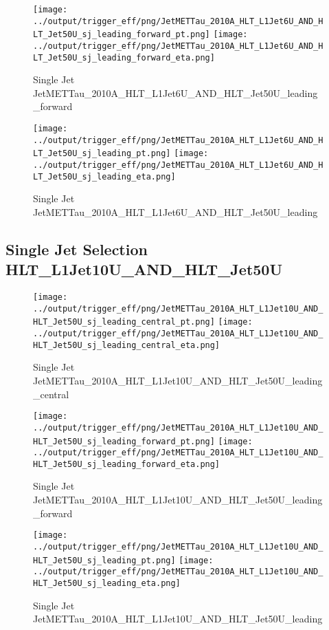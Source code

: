\documentclass[11pt]{article}
\begin{document}
\begin{figure}[ht]
\centering
\texttt{[image: ../output/trigger\_eff/png/JetMETTau\_2010A\_HLT\_L1Jet6U\_AND\_HLT\_Jet50U\_sj\_leading\_forward\_pt.png]}
\texttt{[image: ../output/trigger\_eff/png/JetMETTau\_2010A\_HLT\_L1Jet6U\_AND\_HLT\_Jet50U\_sj\_leading\_forward\_eta.png]}
\caption{Single Jet JetMETTau\_2010A\_HLT\_L1Jet6U\_AND\_HLT\_Jet50U\_leading\_forward}
\label{fig:jetmettau_sj_L1Jet6U_AND_HLT_Jet50U_leading_forward}
\end{figure}

\begin{figure}[ht]
\centering
\texttt{[image: ../output/trigger\_eff/png/JetMETTau\_2010A\_HLT\_L1Jet6U\_AND\_HLT\_Jet50U\_sj\_leading\_pt.png]}
\texttt{[image: ../output/trigger\_eff/png/JetMETTau\_2010A\_HLT\_L1Jet6U\_AND\_HLT\_Jet50U\_sj\_leading\_eta.png]}
\caption{Single Jet JetMETTau\_2010A\_HLT\_L1Jet6U\_AND\_HLT\_Jet50U\_leading}
\label{fig:jetmettau_sj_L1Jet6U_AND_HLT_Jet50U_leading}
\end{figure}


\newpage
\subsection{Single Jet Selection HLT\_L1Jet10U\_AND\_HLT\_Jet50U}
\begin{figure}[ht]
\centering
\texttt{[image: ../output/trigger\_eff/png/JetMETTau\_2010A\_HLT\_L1Jet10U\_AND\_HLT\_Jet50U\_sj\_leading\_central\_pt.png]}
\texttt{[image: ../output/trigger\_eff/png/JetMETTau\_2010A\_HLT\_L1Jet10U\_AND\_HLT\_Jet50U\_sj\_leading\_central\_eta.png]}
\caption{Single Jet JetMETTau\_2010A\_HLT\_L1Jet10U\_AND\_HLT\_Jet50U\_leading\_central}
\label{fig:jetmettau_sj_L1Jet10U_AND_HLT_Jet50U_leading_central}
\end{figure}

\begin{figure}[ht]
\centering
\texttt{[image: ../output/trigger\_eff/png/JetMETTau\_2010A\_HLT\_L1Jet10U\_AND\_HLT\_Jet50U\_sj\_leading\_forward\_pt.png]}
\texttt{[image: ../output/trigger\_eff/png/JetMETTau\_2010A\_HLT\_L1Jet10U\_AND\_HLT\_Jet50U\_sj\_leading\_forward\_eta.png]}
\caption{Single Jet JetMETTau\_2010A\_HLT\_L1Jet10U\_AND\_HLT\_Jet50U\_leading\_forward}
\label{fig:jetmettau_sj_L1Jet10U_AND_HLT_Jet50U_leading_forward}
\end{figure}

\begin{figure}[ht]
\centering
\texttt{[image: ../output/trigger\_eff/png/JetMETTau\_2010A\_HLT\_L1Jet10U\_AND\_HLT\_Jet50U\_sj\_leading\_pt.png]}
\texttt{[image: ../output/trigger\_eff/png/JetMETTau\_2010A\_HLT\_L1Jet10U\_AND\_HLT\_Jet50U\_sj\_leading\_eta.png]}
\caption{Single Jet JetMETTau\_2010A\_HLT\_L1Jet10U\_AND\_HLT\_Jet50U\_leading}
\label{fig:jetmettau_sj_L1Jet10U_AND_HLT_Jet50U_leading}
\end{figure}
\end{document}
